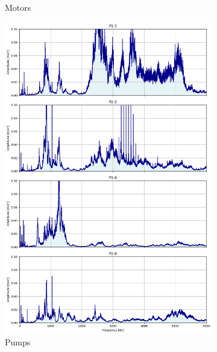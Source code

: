 \begin{figure}[h]
\begin{subfigure}[b]{0.32\textwidth}
        \caption{Motors}
    \end{subfigure}
    \hfill
    \begin{subfigure}[b]{0.32\textwidth}
        \includegraphics[width=\textwidth]{assets/results/eda/frequency-spectrum-pumps.png}
        \caption{Pumps}
    \end{subfigure}
    \hfill
    \begin{subfigure}[b]{0.32\textwidth}

\end{subfigure}
\end{figure}
